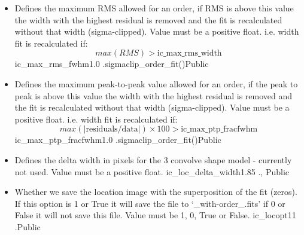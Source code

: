 \begin{itemize}
\item {}
{Defines the maximum RMS allowed for an order, if RMS is above this value the width with the highest residual is removed and the fit is recalculated without that width (sigma-clipped). Value must be a positive float.
\vspace{0.5cm}
i.e. width fit is recalculated if: 
\begin{equation}
max(RMS) > \text{ic\_max\_rms\_width}
\end{equation}
}
{ic\_max\_rms\_fwhm}{1.0}
{\callocRAW}{\constantsfile}{\spirouLOCOR.sigmaclip\_order\_fit()}{Public}


\item {}
{Defines the maximum peak-to-peak value allowed for an order, if the peak to peak is above this value the width with the highest residual is removed and the fit is recalculated without that width (sigma-clipped). Value must be a positive float.
\vspace{0.5cm}
i.e. width fit is recalculated if: 
\begin{equation}
max(|\text{residuals/data}|)\times100 > \text{ic\_max\_ptp\_fracfwhm}
\end{equation}
}
{ic\_max\_ptp\_fracfwhm}{1.0}
{\callocRAW}{\constantsfile}{\spirouLOCOR.sigmaclip\_order\_fit()}{Public}


\item {}
{Defines the delta width in pixels for the 3 convolve shape model - currently not used. Value must be a positive float.}
{ic\_loc\_delta\_width}{1.85}
{\callocRAW}{\constantsfile}{\callocRAW.\progMAIN, \spirouKeywords}{Public}


\item {}
{Whether we save the location image with the superposition of the fit (zeros). If this option is 1 or True it will save the file to `\_with-order\_.fits' if 0 or False it will not save this file. Value must be 1, 0, True or False.}
{ic\_locopt1}{1}
{\callocRAW}{\constantsfile}{\callocRAW.\progMAIN}{Public}


\end{itemize}






